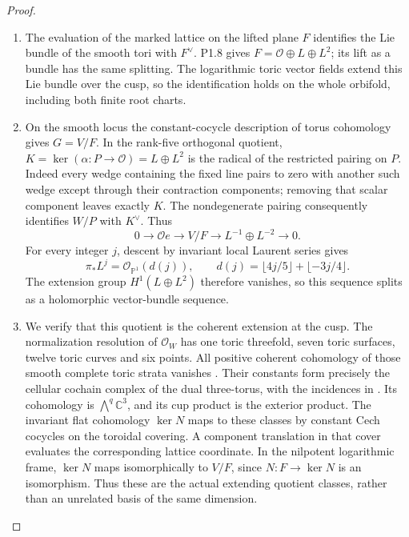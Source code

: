 \documentclass[11pt,a4paper]{article}
\theoremstyle{definition}
\begin{document}
\begin{proof}
\begin{enumerate}[label=\arabic*.]
\item The evaluation of the marked lattice on the lifted plane $F$
identifies the Lie bundle of the smooth tori with $F^\vee$.
P1.8 gives $F=\mathcal O\oplus L\oplus L^2$; its lift as a bundle
has the same splitting. The logarithmic toric vector fields extend
this Lie bundle over the cusp, so the identification holds on the
whole orbifold, including both finite root charts.

\item On the smooth locus the constant-cocycle description of torus
cohomology gives $G=V/F$. In the rank-five orthogonal quotient,
$K=\ker(\alpha:P\to\mathcal O)=L\oplus L^2$ is the radical of
the restricted pairing on $P$. Indeed every wedge containing the
fixed line pairs to zero with another such wedge except through
their contraction components; removing that scalar component
leaves exactly $K$. The nondegenerate pairing consequently
identifies $W/P$ with $K^\vee$. Thus
\[
 0\longrightarrow\mathcal O e\longrightarrow V/F
   \longrightarrow L^{-1}\oplus L^{-2}\longrightarrow0.
\]
For every integer $j$, descent by invariant local Laurent series gives
\begin{equation}\label{eq:P1Adegree}
 \pi_*L^j=\mathcal O_{\mathbb P^1}(d(j)),\qquad
 d(j)=\lfloor4j/5\rfloor+\lfloor-3j/4\rfloor.
\end{equation}
The extension group $H^1(L\oplus L^2)$ therefore vanishes, so this
sequence splits as a holomorphic vector-bundle sequence.

\item We verify that this quotient is the coherent extension at the cusp.
The normalization resolution of $\mathcal O_W$ has one toric
threefold, seven toric surfaces, twelve toric curves and six points.
All positive coherent cohomology of those smooth complete toric
strata vanishes \cite[Theorem 9.2.3, p.~410]{CoxLittleSchenck2011}. Their constants form precisely the cellular
cochain complex of the dual three-torus, with the incidences in
. Its cohomology is
$\bigwedge^q\mathbb C^3$, and its cup product is the exterior product.
The invariant flat cohomology $\ker N$ maps to these classes by
constant Cech cocycles on the toroidal covering. A component
translation in that cover evaluates the corresponding lattice
coordinate. In the nilpotent logarithmic frame, $\ker N$ maps
isomorphically to $V/F$, since $N:F\to\ker N$ is an isomorphism.
Thus these are the actual extending quotient classes, rather than
an unrelated basis of the same dimension.


\end{enumerate}
\end{proof}
\end{document}
